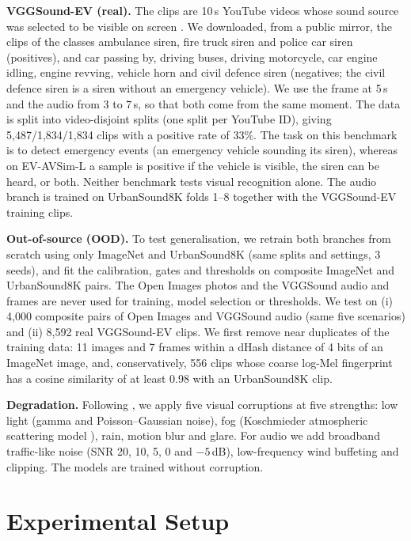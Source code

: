 \documentclass[runningheads,a4paper]{llncs}
\begin{document}
\textbf{VGGSound-EV (real).} The clips are 10\,s YouTube videos whose sound
source was selected to be visible on screen \cite{chen2020}. We downloaded,
from a public mirror, the clips of the classes ambulance siren, fire truck
siren and police car siren (positives), and car passing by, driving buses,
driving motorcycle, car engine idling, engine revving, vehicle horn and civil
defence siren (negatives; the civil defence siren is a siren without an
emergency vehicle). We use the frame at 5\,s and the audio from 3 to 7\,s, so
that both come from the same moment. The data is split into video-disjoint
splits (one split per YouTube ID), giving 5,487/1,834/1,834 clips with a
positive rate of 33\%. The task on this benchmark is to detect emergency
events (an emergency vehicle sounding its siren), whereas on EV-AVSim-L a
sample is positive if the vehicle is visible, the siren can be heard, or both.
Neither benchmark tests visual recognition alone. The audio branch is trained
on UrbanSound8K folds 1--8 together with the VGGSound-EV training clips.

\textbf{Out-of-source (OOD).} To test generalisation, we retrain both
branches from scratch using only ImageNet and UrbanSound8K (same splits and
settings, 3 seeds), and fit the calibration, gates and thresholds on composite
ImageNet and UrbanSound8K pairs. The Open Images photos and the VGGSound audio
and frames are never used for training, model selection or thresholds. We test
on (i) 4,000 composite pairs of Open Images and VGGSound audio (same five
scenarios) and (ii) 8,592 real VGGSound-EV clips. We first remove near
duplicates of the training data: 11 images and 7 frames within a dHash
distance of 4 bits of an ImageNet image, and, conservatively, 556 clips whose
coarse log-Mel fingerprint has a cosine similarity of at least 0.98 with an
UrbanSound8K clip.

\textbf{Degradation.} Following \cite{hendrycks2019}, we apply five visual
corruptions at five strengths: low light (gamma and Poisson--Gaussian noise),
fog (Koschmieder atmospheric scattering model \cite{narasimhan2002}), rain,
motion blur and glare. For audio we add broadband traffic-like noise (SNR 20,
10, 5, 0 and $-5$\,dB), low-frequency wind buffeting and clipping. The models
are trained without corruption.

\section{Experimental Setup}
\label{sec:setup}
\end{document}

